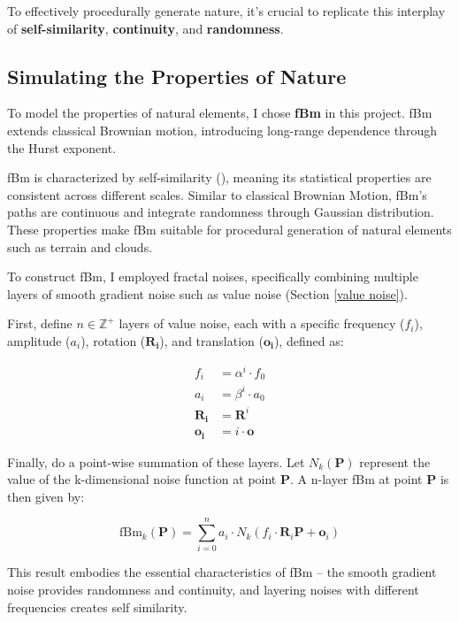 To effectively procedurally generate nature, it's crucial to replicate this interplay of \textbf{self-similarity}, \textbf{continuity}, and \textbf{randomness}.

\subsection{Simulating the Properties of Nature}
\label{FBM}


To model the properties of natural elements, I chose \textbf{fBm} in this project. fBm extends classical Brownian motion, introducing long-range dependence through the Hurst exponent.

fBm is characterized by self-similarity (), meaning its statistical properties are consistent across different scales. Similar to classical Brownian Motion, fBm's paths are continuous and integrate randomness through Gaussian distribution. These properties make fBm suitable for procedural generation of natural elements such as terrain and clouds.

To construct fBm, I employed fractal noises, specifically combining multiple layers of smooth gradient noise such as value noise (Section \ref{value noise}).

First, define $n \in \mathbb{Z}^+$ layers of value noise, each with a specific frequency ($f_i$), amplitude ($a_i$), rotation ($\mathbf{R_i}$), and translation ($\mathbf{o_i}$), defined as:

\begin{align}
f_i &= \alpha^i \cdot f_0 \\
a_{i} &= \beta^i \cdot a_{0}\\
\mathbf{R_i} &= \mathbf{R}^i \\
\mathbf{o_i} &= i\cdot\mathbf{o}
\end{align}

Finally, do a point-wise summation of these layers. Let $N_k(\mathbf{P})$ represent the value of the k-dimensional noise function at point $\mathbf{P}$. A n-layer fBm at point $\mathbf{P}$ is then given by:

\begin{equation}
    \text{fBm}_k(\mathbf{P}) = \sum_{i=0}^{n} a_i \cdot N_k(f_i \cdot \mathbf{R}_i\mathbf{P} + \mathbf{o}_i)
\end{equation}

This result embodies the essential characteristics of fBm -- the smooth gradient noise provides randomness and continuity, and layering noises with different frequencies creates self similarity.


